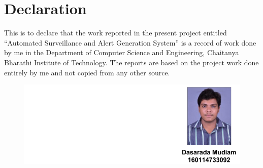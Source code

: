 \cleardoublepage
{}
{}
\chapter*{Declaration}
This is to declare that the work reported in the present project entitled “Automated Surveillance and Alert Generation System” is a record of work done by me in the Department of Computer Science and Engineering, Chaitanya Bharathi Institute of Technology. The reports are based on the project work done entirely by me and not copied from any other source.

\begin{figure}[H]
\centering
\includegraphics[width = \linewidth]{92.PNG}
\end{figure}

\newpage
